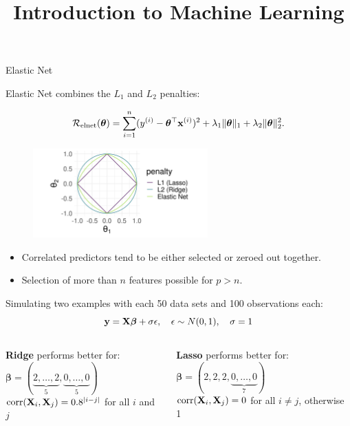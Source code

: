 \documentclass[11pt,compress,t,notes=noshow, xcolor=table]{beamer}
\title{Introduction to Machine Learning}
\date{}
\begin{document}




\begin{vbframe} {Elastic Net}


Elastic Net combines the $L_1$ and $L_2$ penalties:

$$
\mathcal{R}_{\text{elnet}}(\bm{\theta}) =  \sum\limits_{i=1}^n (y^{(i)} - \bm{\theta}^\top \mathbf{x}^{(i)})^2 + \lambda_1 \|\bm{\theta}\|_1 + \lambda_2 \|\bm{\theta}\|_2^2.
$$

\begin{figure}
\includegraphics[width=0.6\textwidth]{figure/lasso_ridge_enet_2d.png}\\
\end{figure}


\begin{itemize}
\item Correlated predictors tend to be either selected or zeroed out together.
\item Selection of more than $n$ features possible for $p>n$.
\end{itemize}


\framebreak
\footnotesize
Simulating two examples with each 50 data sets and 100 observations each: \\


$$\mathbf{y} =\mathbf{X} \boldsymbol{\beta}+\sigma \epsilon, \quad \epsilon \sim N(0,1), \quad \sigma = 1$$
  
  \begin{columns}
\begin{column}{0.5\textwidth}
\begin{center}
\textbf{Ridge} performs better for: \\ 
$\boldsymbol{\beta}=(\underbrace{2,\ldots,2}_{5},\underbrace{0,\ldots,0}_{5})$\\
$ \operatorname{corr}(\mathbf{X}_{i},\mathbf{X}_{j})=0.8^{|i-j|}$ for all $i$ and $j$
  \end{center}
\end{column}
\begin{column}{0.5\textwidth} 
\begin{center}
\textbf{Lasso} performs better for: \\
$\boldsymbol{\beta}=(2, 2, 2,\underbrace{0,\ldots,0}_{7})$ \\
$\operatorname{corr}(\mathbf{X}_{i},\mathbf{X}_{j})= 0$ for all $i \neq j$, otherwise 1
\end{center}
\end{column}
\end{columns}


\end{vbframe}
\end{document}
